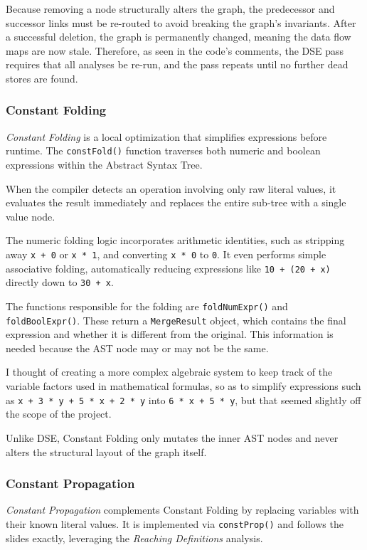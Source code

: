 \documentclass[12pt]{article}
\newcommand{\Code}[1]{\texttt{#1}}
\begin{document}
Because removing a node structurally alters the graph, the predecessor and
successor links must be re-routed to avoid breaking the graph's invariants.
After a successful deletion, the graph is permanently changed, meaning the data
flow maps are now stale. Therefore, as seen in the code's comments, the DSE pass
requires that all analyses be re-run, and the pass repeats until no further dead
stores are found.

\subsubsection{Constant Folding}

\textit{Constant Folding} is a local optimization that simplifies expressions
before runtime. The \Code{constFold()} function traverses both numeric and
boolean expressions within the Abstract Syntax Tree.

When the compiler detects an operation involving only raw literal values, it
evaluates the result immediately and replaces the entire sub-tree with a single
value node.

The numeric folding logic incorporates arithmetic identities, such as stripping
away \Code{x + 0} or \Code{x * 1}, and converting \Code{x * 0} to \Code{0}. It
even performs simple associative folding, automatically reducing expressions
like \Code{10 + (20 + x)} directly down to \Code{30 + x}.

The functions responsible for the folding are \Code{foldNumExpr()} and
\Code{foldBoolExpr()}. These return a \Code{MergeResult} object, which contains
the final expression and whether it is different from the original. This
information is needed because the AST node may or may not be the same.

I thought of creating a more complex algebraic system to keep track of the
variable factors used in mathematical formulas, so as to simplify expressions
such as \Code{x + 3 * y + 5 * x + 2 * y} into \Code{6 * x + 5 * y}, but that
seemed slightly off the scope of the project.

Unlike DSE, Constant Folding only mutates the inner AST nodes and never alters
the structural layout of the graph itself.

\subsubsection{Constant Propagation}

\textit{Constant Propagation} complements Constant Folding by replacing
variables with their known literal values. It is implemented via
\Code{constProp()} and follows the slides exactly, leveraging the
\textit{Reaching Definitions} analysis.
\end{document}
